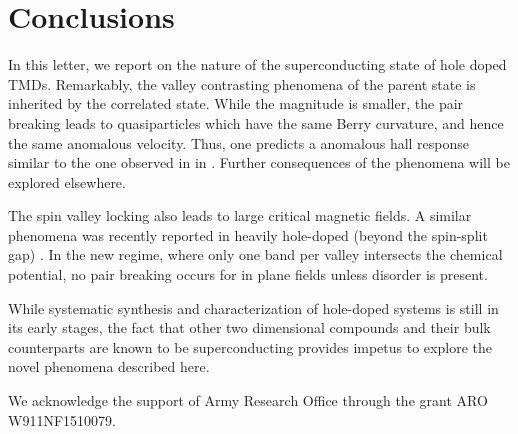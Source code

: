 \section{Conclusions}

In this letter, we report on the nature of the superconducting state
of hole doped TMDs.
Remarkably, the valley contrasting phenomena of the parent state
is inherited by the correlated state.
While the magnitude is smaller, the pair breaking leads to quasiparticles
which have the same Berry curvature, and hence the same anomalous velocity.
Thus, one predicts a anomalous hall response similar to
the one observed in in .
Further consequences of the phenomena will be explored elsewhere.

The spin valley locking also leads to large critical magnetic fields.
A similar phenomena was recently reported in heavily hole-doped
(beyond the spin-split gap) .
In the new regime, where only one band per valley intersects
the chemical potential, no pair breaking occurs
for in plane fields unless disorder is present.

While systematic synthesis and characterization of hole-doped systems
is still in its early stages, the fact that other two dimensional compounds
and their bulk counterparts are known to be superconducting
provides impetus to explore the novel phenomena described here.

We acknowledge the support of Army Research Office through the grant
ARO W911NF1510079.
